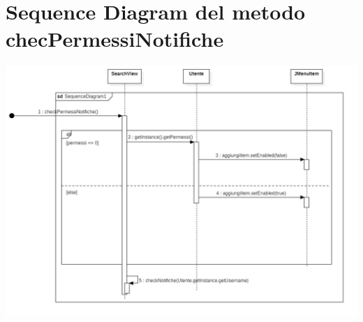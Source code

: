 \section{Sequence Diagram del metodo checPermessiNotifiche}
\includegraphics[scale=0.28, center]{Immagini/checkPermNot_SD.jpg}
